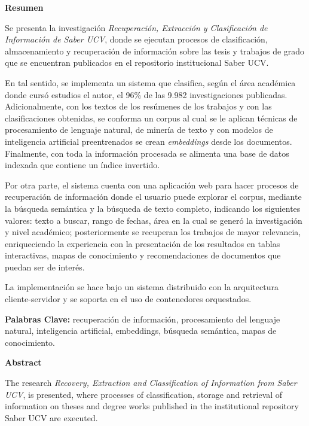 \documentclass[
  12pt,
  openany]{book}
\begin{document}
\newpage
\thispagestyle{empty}
\large{\textbf{Resumen}}

Se presenta la investigación \emph{Recuperación, Extracción y Clasificación de Información de Saber UCV}, donde se ejecutan procesos de clasificación, almacenamiento y recuperación de información sobre las tesis y trabajos de grado que se encuentran publicados en el repositorio institucional Saber UCV.

En tal sentido, se implementa un sistema que clasifica, según el área académica donde cursó estudios el autor, el 96\% de las {9.982} investigaciones publicadas. Adicionalmente, con los textos de los resúmenes de los trabajos y con las clasificaciones obtenidas, se conforma un corpus al cual se le aplican técnicas de procesamiento de lenguaje natural, de minería de texto y con modelos de inteligencia artificial preentrenados se crean \textit{embeddings} desde los documentos. Finalmente, con toda la información procesada se alimenta una base de datos indexada que contiene un índice invertido.


Por otra parte, el sistema cuenta con una aplicación web para hacer procesos de recuperación de información donde el usuario puede explorar el corpus, mediante la búsqueda semántica y la búsqueda de texto completo, indicando los siguientes valores: texto a buscar, rango de fechas, área en la cual se generó la investigación y nivel académico; posteriormente se recuperan los trabajos de mayor relevancia, enriqueciendo la experiencia con la presentación de los resultados en tablas interactivas, mapas de conocimiento y recomendaciones de documentos que puedan ser de interés.

La implementación se hace bajo un sistema distribuido con la arquitectura cliente-servidor y se soporta en el uso de contenedores orquestados.

\vspace*{2cm}

\textbf{Palabras Clave:} recuperación de información, procesamiento del lenguaje natural, inteligencia artificial, embeddings, búsqueda semántica, mapas de conocimiento.




\newpage
\thispagestyle{empty}
\large{\textbf{Abstract}}

The research \emph{Recovery, Extraction and Classification of Information from Saber UCV}, is presented, where processes of classification, storage and retrieval of information on theses and degree works published in the institutional repository Saber UCV are executed.
\end{document}
